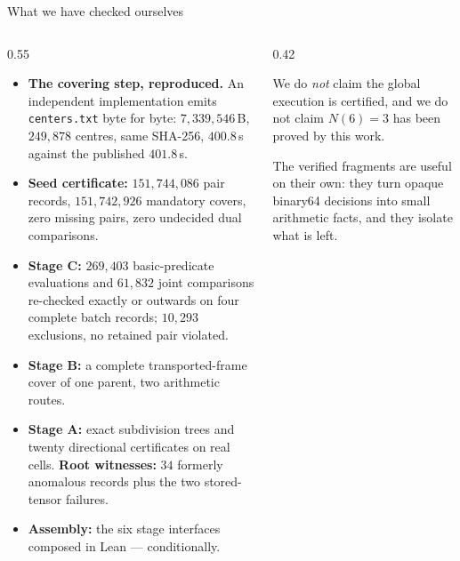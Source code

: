 \documentclass[aspectratio=169,10pt]{beamer}
\begin{document}
\begin{frame}{What we have checked ourselves}
  \small
  \begin{columns}[T]
  \begin{column}{0.55\textwidth}
    \begin{itemize}\footnotesize\setlength{\itemsep}{0.8mm}
      \item \textbf{The covering step, reproduced.} An independent implementation emits
            \texttt{centers.txt} byte for byte: $7{,}339{,}546$\,B, $249{,}878$ centres,
            same SHA-256, $400.8$\,s against the published $401.8$\,s.
      \item \textbf{Seed certificate:} $151{,}744{,}086$ pair records, $151{,}742{,}926$ mandatory
            covers, zero missing pairs, zero undecided dual comparisons.
      \item \textbf{Stage C:} $269{,}403$ basic-predicate evaluations and $61{,}832$ joint
            comparisons re-checked exactly or outwards on four complete batch records;
            $10{,}293$ exclusions, no retained pair violated.
      \item \textbf{Stage B:} a complete transported-frame cover of one parent, two arithmetic routes.
      \item \textbf{Stage A:} exact subdivision trees and twenty directional certificates on real
            cells. \textbf{Root witnesses:} $34$ formerly anomalous records plus the two
            stored-tensor failures.
      \item \textbf{Assembly:} the six stage interfaces composed in Lean --- conditionally.
    \end{itemize}
  \end{column}
  \begin{column}{0.42\textwidth}
    \begin{block}{}
      \small We do \emph{not} claim the global execution is certified, and we do not claim
      $N(6)=3$ has been proved by this work.
    \end{block}
    \vspace{2mm}
    {\scriptsize\color{ink!70} The verified fragments are useful on their own: they turn opaque
    binary64 decisions into small arithmetic facts, and they isolate what is left.}
  \end{column}
  \end{columns}
\end{frame}
\end{document}
